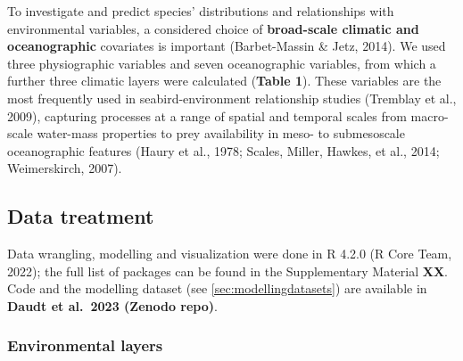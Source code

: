 \documentclass{article}
\begin{document}
To investigate and predict species' distributions and relationships with
environmental variables, a considered choice of \textbf{broad-scale
climatic and oceanographic} covariates is important (Barbet-Massin \&
Jetz, 2014). We used three physiographic variables and seven
oceanographic variables, from which a further three climatic layers were
calculated (\textbf{Table 1}). These variables are the most frequently
used in seabird-environment relationship studies (Tremblay et al.,
2009), capturing processes at a range of spatial and temporal scales
from macro-scale water-mass properties to prey availability in meso- to
submesoscale oceanographic features (Haury et al., 1978; Scales, Miller,
Hawkes, et al., 2014; Weimerskirch, 2007).

\hypertarget{data-treatment}{%
\subsection{Data treatment}\label{data-treatment}}

Data wrangling, modelling and visualization were done in R 4.2.0 (R Core
Team, 2022); the full list of packages can be found in the Supplementary
Material \textbf{XX}. Code and the modelling dataset (see
\ref{sec:modellingdatasets}) are available in \textbf{Daudt et al.~2023
(Zenodo repo)}.

\hypertarget{environmental-layers}{%
\subsubsection{Environmental layers}\label{environmental-layers}}
\end{document}
